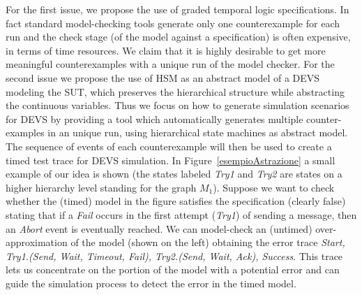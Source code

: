 \documentclass[letterpaper,twocolumn,10pt]{article}
\begin{document}
For the first issue, we propose the use of graded temporal logic specifications. In fact
standard model-checking tools generate only one counterexample for each
run and the check stage (of the model against a specification) is often expensive, in terms
of time resources.
We claim that it is highly desirable to get more meaningful counterexamples with a unique
run of the model checker.
For the second issue we propose the use of HSM as an abstract model of a DEVS
modeling the SUT, which preserves the
hierarchical structure while abstracting the continuous variables.
Thus we focus on how to generate simulation scenarios for
DEVS by providing a tool  which automatically generates multiple
counter-examples in an unique run, using hierarchical state machines as abstract model.
The sequence of events of each counterexample will
then be used to create a timed test trace for DEVS simulation.
In Figure~\ref{esempioAstrazione} a small example of our idea is shown
(the states labeled {\em Try1} and {\em Try2} are states on a higher hierarchy level
standing for the graph $M_1$).
Suppose we want to check whether the (timed) model in the figure satisfies the specification
(clearly false) stating that if a {\em Fail} occurs in the first attempt ({\em Try1}) of sending a message,
then an {\em Abort} event is eventually reached.
We can model-check an (untimed) over-approximation of the model (shown on the left)
obtaining the error trace {\em Start, Try1.(Send, Wait, Timeout, Fail), Try2.(Send, Wait, Ack), Success}.
This trace lets us concentrate on the portion of the model with a
potential error and can guide the simulation process to detect the error in the timed model.
\end{document}
